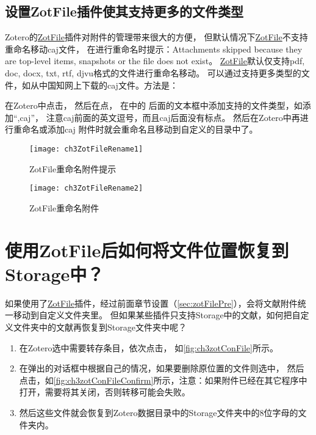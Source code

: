\documentclass[cn,11pt,chinese]{elegantbook}
\begin{document}
\begin{enumerate}
	\section{设置ZotFile插件使其支持更多的文件类型}\label{sec:zotFile_more_filetype}
	    \quad \quad Zotero的\href{http://zotfile.com/}{ZotFile}插件对附件的管理带来很大的方便，
		但默认情况下\href{http://zotfile.com/}{ZotFile}不支持重命名移动caj文件，
		在进行重命名时提示：Attachments skipped because they are top-level items, 
		snapshots or the file does not exist。
		\href{http://zotfile.com/}{ZotFile}默认仅支持pdf, doc, docx, txt, rtf, djvu格式的文件进行重命名移动。
		可以通过支持更多类型的文件，如从中国知网上下载的caj文件。方法是：

		\quad \quad 在Zotero中点击，
		然后在点，
		在中的
		后面的文本框中添加支持的文件类型，如添加“,caj”，
		注意caj前面的英文逗号，而且caj后面没有标点。
		然后在Zotero中再进行重命名或添加caj
		附件时就会重命名且移动到自定义的目录中了。

	
			\begin{figure}[htbp]
				\centering
				\texttt{[image: ch3ZotFileRename1]}
				\caption{ZotFile重命名附件提示}
				\label{fig:ch3ZotFileRename1}
			\end{figure}
			\begin{figure}[htbp]
				\centering
				\texttt{[image: ch3ZotFileRename2]}
				\caption{ZotFile重命名附件}
				\label{fig:ch3ZotFileRename2}
			\end{figure}
		\end{enumerate}

	\section{使用ZotFile后如何将文件位置恢复到Storage中？}\label{sec:zotFile_restore_storage}
	如果使用了\href{http://zotfile.com/}{ZotFile}插件，经过前面章节设置（\cref{sec:zotFilePre}），会将文献附件统一移动到自定义文件夹里。
	但如果某些插件只支持Storage中的文献，如何把自定义文件夹中的文献再恢复到Storage文件夹中呢？

	\begin{enumerate}
		\item 在Zotero选中需要转存条目，依次点击，
		如\autoref{fig:ch3zotConFile}所示。
		\item 在弹出的对话框中根据自己的情况，如果要删除原位置的文件则选中，
		然后点击，如\autoref{fig:ch3zotConFileConfirm}所示，注意：如果附件已经在其它程序中打开，需要将其关闭，否则转移可能会失败。
		\item 然后这些文件就会恢复到Zotero数据目录中的Storage文件夹中的8位字母的文件夹内。
	\end{enumerate}
	
\end{document}

